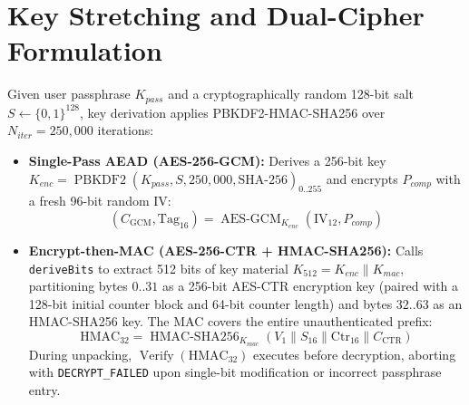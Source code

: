 \documentclass[12pt,a4paper,oneside,openany]{report}
\begin{document}
\section{Key Stretching and Dual-Cipher Formulation}
Given user passphrase $K_{pass}$ and a cryptographically random 128-bit salt $S \leftarrow \{0,1\}^{128}$, key derivation applies PBKDF2-HMAC-SHA256 \cite{rfc8018} over $N_{iter} = 250{,}000$ iterations:
\begin{itemize}
    \item \textbf{Single-Pass AEAD (AES-256-GCM):} Derives a 256-bit key $K_{enc} = \operatorname{PBKDF2}(K_{pass}, S, 250{,}000, \text{SHA-256})_{0..255}$ and encrypts $P_{comp}$ with a fresh 96-bit random IV:
    \begin{equation}
        (C_{\text{GCM}}, \text{Tag}_{16}) = \operatorname{AES\text{-}GCM}_{K_{enc}}(\text{IV}_{12}, P_{comp})
    \end{equation}
    \item \textbf{Encrypt-then-MAC (AES-256-CTR + HMAC-SHA256):} Calls \texttt{deriveBits} to extract 512 bits of key material $K_{512} = K_{enc} \parallel K_{mac}$, partitioning bytes $0..31$ as a 256-bit AES-CTR encryption key (paired with a 128-bit initial counter block and 64-bit counter length) and bytes $32..63$ as an HMAC-SHA256 key. The MAC covers the entire unauthenticated prefix:
    \begin{equation}
        \text{HMAC}_{32} = \operatorname{HMAC\text{-}SHA256}_{K_{mac}}\left(V_1 \parallel S_{16} \parallel \text{Ctr}_{16} \parallel C_{\text{CTR}}\right)
    \end{equation}
    During unpacking, $\operatorname{Verify}(\text{HMAC}_{32})$ executes before decryption, aborting with \texttt{DECRYPT\_FAILED} upon single-bit modification or incorrect passphrase entry.
\end{itemize}
\end{document}
